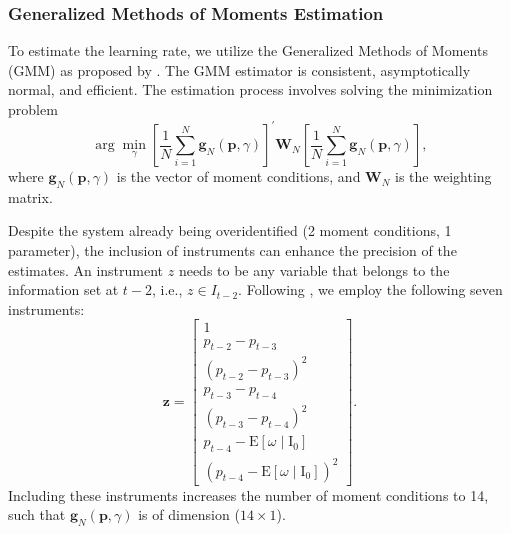 \documentclass[webpdf,modern,medium]{oup-authoring-template}
\newcommand{\bs}{\boldsymbol}
\theoremstyle{thmstyleone}%
\theoremstyle{thmstyletwo}%
\theoremstyle{thmstylethree}%
\begin{document}
\subsubsection{Generalized Methods of Moments Estimation}

    To estimate the learning rate, we utilize the Generalized Methods of Moments (GMM) as proposed by \citet{hansen1982}. The GMM estimator is consistent, asymptotically normal, and efficient. The estimation process involves solving the minimization problem
    \begin{equation}
        \arg \min_{\gamma}\left[\frac{1}{N} \sum_{i=1}^N \bs{g}_N\left(\bs{p}, \gamma \right)\right]^{\prime}\bs{W}_N\left[\frac{1}{N} \sum_{i=1}^N \bs{g}_N\left(\bs{p}, \gamma \right)\right],
    \label{eq:first_stage_min}
    \end{equation}
    where $\bs{g}_N\left(\bs{p}, \gamma \right)$ is the vector of moment conditions, and $\bs{W}_N$ is the weighting matrix.

    Despite the system already being overidentified (2 moment conditions, 1 parameter), the inclusion of instruments can enhance the precision of the estimates. An instrument $z$ needs to be any variable that belongs to the information set at $t-2$, i.e., $z \in I_{t−2}$. Following \citet{biais1999}, we employ the following seven instruments:
    \begin{equation*}
        \bs{z} = \left[\begin{array}{c}
        1 \\
        p_{t - 2} - p_{t - 3}  \\
        \left(p_{t - 2} - p_{t - 3}\right)^2 \\
        p_{t - 3} - p_{t - 4} \\
        \left(p_{t - 3} - p_{t - 4}\right)^2 \\
        p_{t - 4} - \mathrm{E}\left[\omega \mid \mathrm{I}_0\right] \\
        \left(p_{t - 4} - \mathrm{E}\left[\omega \mid \mathrm{I}_0\right]\right)^2
        \end{array}\right].
    \end{equation*}
    Including these instruments increases the number of moment conditions to 14, such that $\bs{g}_N\left(\bs{p}, \gamma \right)$ is of dimension ($14 \times 1$).
\end{document}

